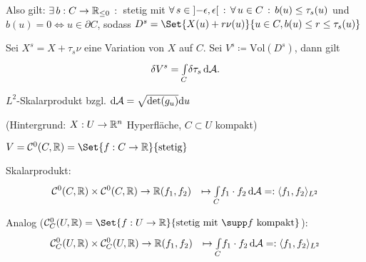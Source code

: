 \documentclass{cheat-sheet}
\begin{document}
Also gilt: $\exists \, {b : C \to \mathbb{R}_{\leq 0}} \,:\,$ stetig
mit $\forall \, {s \in \left] -\epsilon, \epsilon \right[} \,:\, \forall \, {u \in C} \,:\, b(u) \leq \tau_s(u)$ und $b(u) = 0 \iff u \in \partial C$, sodass $D^s = \Set{X(u) + r \nu(u)}{ u \in C, b(u) \leq r \leq \tau_s(u) }$

\begin{prop}
  Sei $X^s = X + \tau_s \nu$ eine Variation von $X$ auf $C$. Sei $V^s \coloneqq \mathrm{Vol}(D^s)$, dann gilt
  \[ \delta V^s = {\textstyle \int\limits_{C}^{}} \delta \tau_s \,\mathrm{d} \mathcal{A}. \]
\end{prop}

$L^2$-Skalarprodukt bzgl. $\mathrm{d} \mathcal{A} = \sqrt{\det(g_u)} \mathrm{d} u$

(Hintergrund: $X : U \to \mathbb{R}^n$ Hyperfläche, $C \subset U$ kompakt)

$V = \mathcal{C}^0(C, \R) = \Set{ f : C \to \R }{ \text{stetig} }$

Skalarprodukt:
\begin{align*}
  \mathcal{C}^0(C, \mathbb{R}) \times \mathcal{C}^0(C, \mathbb{R}) &\to \mathbb{R}
  (f_1, f_2) &\mapsto {\textstyle \int\limits_{C}^{}} f_1 \cdot f_2 \,\mathrm{d} \mathcal{A} =: \langle f_1 , f_2 \rangle_{L^2}
\end{align*}

Analog ($\mathcal{C}^0_C(U, \R) = \Set{ f : U \to \R }{ \text{stetig mit } \supp f \text{ kompakt} }$):
\begin{align*}
  \mathcal{C}^0_C(U, \mathbb{R}) \times \mathcal{C}^0_C(U, \mathbb{R}) &\to \mathbb{R}
  (f_1, f_2) &\mapsto {\textstyle \int\limits_{C}^{}} f_1 \cdot f_2 \,\mathrm{d} \mathcal{A} =: \langle f_1 , f_2 \rangle_{L^2}
\end{align*}
\end{document}
